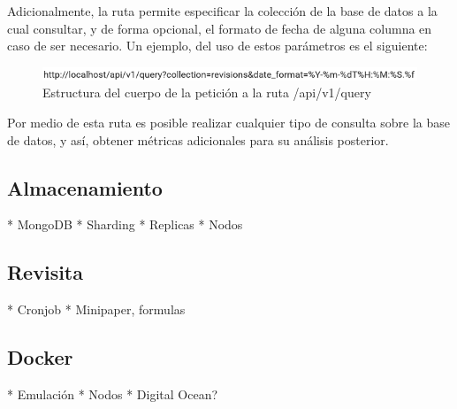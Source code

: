 Adicionalmente, la ruta permite especificar la colección de la base de datos a la cual consultar, y de forma opcional,
el formato de fecha de alguna columna en caso de ser necesario.
Un ejemplo, del uso de estos parámetros es el siguiente:

\begin{figure}[H]
	\centering
		\includegraphics[width=1\textwidth]{figures/query_url}
	\caption{Estructura del cuerpo de la petición a la ruta /api/v1/query}
	\label{fig:query_url}
\end{figure}

Por medio de esta ruta es posible realizar cualquier tipo de consulta sobre la base de datos, y así, obtener métricas
adicionales para su análisis posterior.

\subsection{Almacenamiento}

* MongoDB
* Sharding
* Replicas
* Nodos

\subsection{Revisita}

* Cronjob
* Minipaper, formulas

\subsection{Docker}

* Emulación
* Nodos
* Digital Ocean?
